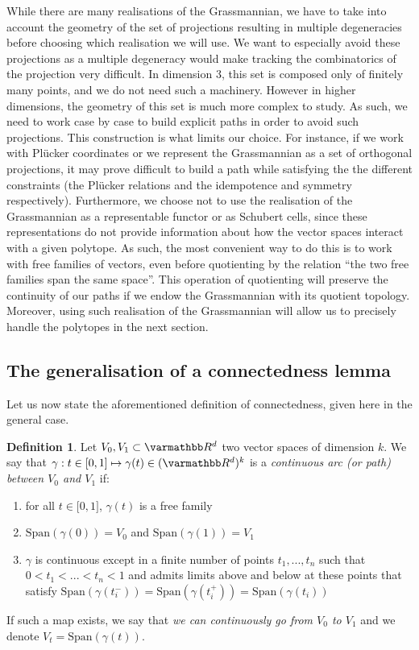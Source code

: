 \documentclass[12pt, notitlepage]{article}
\renewcommand{\mathbb}{\varmathbb}
\theoremstyle{plain}
\theoremstyle{definition}
\newtheorem{defin}{Definition}
\theoremstyle{plain}
\theoremstyle{remark}
\theoremstyle{plain}
\theoremstyle{plain}
\newcommand{\R}{\mathbb R}
\newcommand{\vect}{\text{Span}}
\begin{document}
While there are many realisations of the Grassmannian, we have to take into account the geometry of the set of projections resulting in multiple degeneracies before choosing which realisation we will use. We want to especially avoid these projections as a multiple degeneracy would make tracking the combinatorics of the projection very difficult. In dimension 3, this set is composed only of finitely many points, and we do not need such a machinery. However in higher dimensions, the geometry of this set is much more complex to study. As such, we need to work case by case to build explicit paths in order to avoid such projections. This construction is what limits our choice. For instance, if we work with Plücker coordinates or we represent the Grassmannian as a set of orthogonal projections, it may prove difficult to build a path while satisfying the the different constraints (the Plücker relations and the idempotence and symmetry respectively). Furthermore, we choose not to use the realisation of the Grassmannian as a representable functor or as Schubert cells, since these representations do not provide information about how the vector spaces interact with a given polytope. As such, the most convenient way to do this is to work with free families of vectors, even before quotienting by the relation “the two free families span the same space”. This operation of quotienting will preserve the continuity of our paths if we endow the Grassmannian with its quotient topology. Moreover, using such realisation of the Grassmannian will allow us to precisely handle the polytopes in the next section.

\subsection{The generalisation of a connectedness lemma}

Let us now state the aforementioned definition of connectedness, given here in the general case.

\begin{defin}
    Let $V_0,V_1\subset \R^d$ two vector spaces of dimension $k$. We say that $\gamma : t \in \mathopen[0,1\mathclose] \mapsto \gamma(t) \in (\R^d)^{k} $ is a \emph{continuous arc (or path) between $V_0$ and $V_1$} if: \begin{enumerate}
        \item for all $t \in \mathopen[0,1\mathclose]$, $\gamma(t)$ is a free family
        \item $\vect(\gamma(0))= V_0$ and $\vect(\gamma(1))= V_1$
        \item $\gamma$ is continuous except in a finite number of points $t_1,...,t_n$ such that $0<t_1<...<t_n<1$ and admits limits above and below at these points that satisfy $\vect(\gamma(t_i^-)) = \vect(\gamma(t_i^+)) = \vect(\gamma(t_i))$
    \end{enumerate}
    If such a map exists, we say that \emph{we can continuously go from $V_0$ to $V_1$} and we denote $V_t = \vect(\gamma(t))$.
\end{defin}
\end{document}

